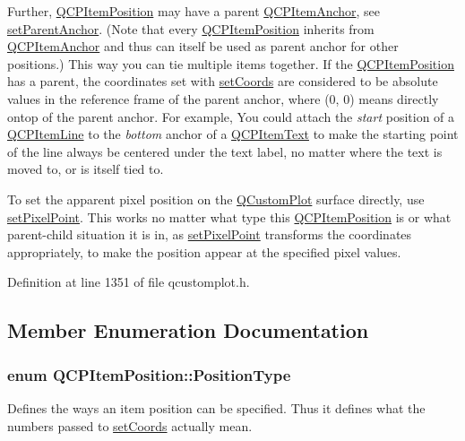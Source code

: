 Further, \hyperlink{class_q_c_p_item_position}{Q\-C\-P\-Item\-Position} may have a parent \hyperlink{class_q_c_p_item_anchor}{Q\-C\-P\-Item\-Anchor}, see \hyperlink{class_q_c_p_item_position_ac094d67a95d2dceafa0d50b9db3a7e51}{set\-Parent\-Anchor}. (Note that every \hyperlink{class_q_c_p_item_position}{Q\-C\-P\-Item\-Position} inherits from \hyperlink{class_q_c_p_item_anchor}{Q\-C\-P\-Item\-Anchor} and thus can itself be used as parent anchor for other positions.) This way you can tie multiple items together. If the \hyperlink{class_q_c_p_item_position}{Q\-C\-P\-Item\-Position} has a parent, the coordinates set with \hyperlink{class_q_c_p_item_position_aa988ba4e87ab684c9021017dcaba945f}{set\-Coords} are considered to be absolute values in the reference frame of the parent anchor, where (0, 0) means directly ontop of the parent anchor. For example, You could attach the {\itshape start} position of a \hyperlink{class_q_c_p_item_line}{Q\-C\-P\-Item\-Line} to the {\itshape bottom} anchor of a \hyperlink{class_q_c_p_item_text}{Q\-C\-P\-Item\-Text} to make the starting point of the line always be centered under the text label, no matter where the text is moved to, or is itself tied to.

To set the apparent pixel position on the \hyperlink{class_q_custom_plot}{Q\-Custom\-Plot} surface directly, use \hyperlink{class_q_c_p_item_position_ab404e56d9ac2ac2df0382c57933a71ef}{set\-Pixel\-Point}. This works no matter what type this \hyperlink{class_q_c_p_item_position}{Q\-C\-P\-Item\-Position} is or what parent-\/child situation it is in, as \hyperlink{class_q_c_p_item_position_ab404e56d9ac2ac2df0382c57933a71ef}{set\-Pixel\-Point} transforms the coordinates appropriately, to make the position appear at the specified pixel values. 

Definition at line 1351 of file qcustomplot.\-h.



\subsection{Member Enumeration Documentation}
\hypertarget{class_q_c_p_item_position_aad9936c22bf43e3d358552f6e86dbdc8}{
\subsubsection[{Position\-Type}]{\setlength{\rightskip}{0pt plus 5cm}enum {\bf Q\-C\-P\-Item\-Position\-::\-Position\-Type}}}\label{class_q_c_p_item_position_aad9936c22bf43e3d358552f6e86dbdc8}
Defines the ways an item position can be specified. Thus it defines what the numbers passed to \hyperlink{class_q_c_p_item_position_aa988ba4e87ab684c9021017dcaba945f}{set\-Coords} actually mean.

